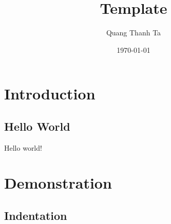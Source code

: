 \documentclass[ngerman,parskip]{scrbook}
\title{Template}
\author{Quang Thanh Ta}
\date{\today}
\begin{document}
\maketitle
\tableofcontents

\chapter{Introduction}
\section{Hello World}
Hello world!

\chapter{Demonstration}
\section{Indentation}
\Blindtext
\Blinddocument
\end{document}
